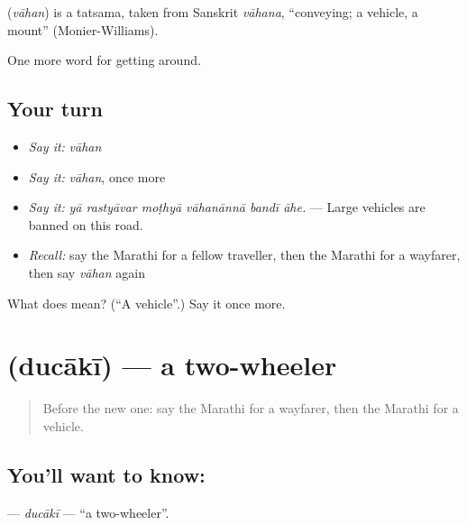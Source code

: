 \begin{cousinweb}
\textbf{} (\emph{vāhan}) is a tatsama, taken from Sanskrit \emph{vāhana}, \textquotedblleft{}conveying; a vehicle, a mount\textquotedblright{} (Monier-Williams).
\end{cousinweb}

\begin{grammarlens}[title={What you've built}]
One more word for getting around.
\end{grammarlens}

\subsection*{Your turn}
\begin{itemize}
\raggedright
  \item \emph{Say it:} \emph{vāhan}
  \item \emph{Say it:} \emph{vāhan}, once more
  \item \emph{Say it:} \emph{yā rastyāvar moṭhyā vāhanānnā bandī āhe.} — Large vehicles are banned on this road.
  \item \emph{Recall:} say the Marathi for a fellow traveller, then the Marathi for a wayfarer, then say \emph{vāhan} again
\end{itemize}

\begin{tcolorbox}[breakable,colback=teal!4,colframe=teal!35!black,title={Before you move on}]
What does  mean? (\textquotedblleft{}A vehicle\textquotedblright{}.) Say it once more.
\end{tcolorbox}
\section[\texorpdfstring{\mr{दुचाकी} (ducākī)}{दुचाकी (ducākī)}]{ (ducākī) — a two-wheeler}

\label{lesson:MR-C400-ducaki}



\begin{quote}
Before the new one: say the Marathi for a wayfarer, then the Marathi for a vehicle.
\end{quote}

\subsection*{You'll want to know: }
\textbf{} — \emph{ducākī} — \textquotedblleft{}a two-wheeler\textquotedblright{}.

